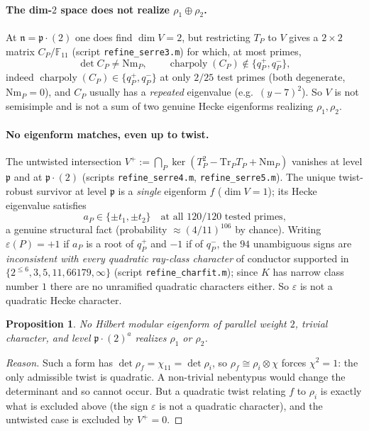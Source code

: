 \documentclass[11pt]{article}
\newtheorem{proposition}{Proposition}
\newcommand{\bbF}{\mathbb{F}}
\newcommand{\Tr}{\mathrm{Tr}}
\newcommand{\Nm}{\mathrm{Nm}}
\newcommand{\chicyc}{\chi_{11}}
\begin{document}
\paragraph{The dim-$2$ space does not realize $\rho_1\oplus\rho_2$.} At
$\mathfrak n=\mathfrak p\cdot(2)$ one does find $\dim V=2$, but restricting $T_P$ to $V$ gives a
$2\times2$ matrix $C_P/\bbF_{11}$ (script \texttt{refine\_serre3.m}) for which, at most primes,
\[
\det C_P \ne \Nm_P,\qquad \operatorname{charpoly}(C_P)\notin\{q_P^+,q_P^-\},
\]
indeed $\operatorname{charpoly}(C_P)\in\{q_P^+,q_P^-\}$ at only $2/25$ test primes (both
degenerate, $\Nm_P=0$), and $C_P$ usually has a \emph{repeated} eigenvalue (e.g.\ $(y-7)^2$).
So $V$ is not semisimple and is not a sum of two genuine Hecke eigenforms realizing
$\rho_1,\rho_2$.

\paragraph{No eigenform matches, even up to twist.} The untwisted intersection
$V^+:=\bigcap_P\ker(T_P^2-\Tr_P T_P+\Nm_P)$ vanishes at level $\mathfrak p$ and at
$\mathfrak p\cdot(2)$ (scripts \texttt{refine\_serre4.m}, \texttt{refine\_serre5.m}). The unique
twist-robust survivor at level $\mathfrak p$ is a \emph{single} eigenform $f$ ($\dim V=1$); its
Hecke eigenvalue satisfies
\[
a_P \in \{\pm t_1,\pm t_2\}\quad\text{at all }120/120\text{ tested primes,}
\]
a genuine structural fact (probability $\approx(4/11)^{106}$ by chance). Writing
$\varepsilon(P)=+1$ if $a_P$ is a root of $q_P^+$ and $-1$ if of $q_P^-$, the $94$ unambiguous
signs are \emph{inconsistent with every quadratic ray-class character} of conductor supported
in $\{2^{\le6},3,5,11,66179,\infty\}$ (script \texttt{refine\_charfit.m}); since $K$ has narrow
class number $1$ there are no unramified quadratic characters either. So $\varepsilon$ is not a
quadratic Hecke character.

\begin{proposition}\label{prop:no-match}
No Hilbert modular eigenform of parallel weight $2$, trivial character, and level
$\mathfrak p\cdot(2)^a$ realizes $\rho_1$ or $\rho_2$.
\end{proposition}

\begin{proof}[Reason]
Such a form has $\det\rho_f=\chicyc=\det\rho_i$, so $\rho_f\cong\rho_i\otimes\chi$ forces
$\chi^2=1$: the only admissible twist is quadratic. A non-trivial nebentypus would change the
determinant and so cannot occur. But a quadratic twist relating $f$ to $\rho_i$ is exactly what
is excluded above (the sign $\varepsilon$ is not a quadratic character), and the untwisted case
is excluded by $V^+=0$.
\end{proof}
\end{document}
